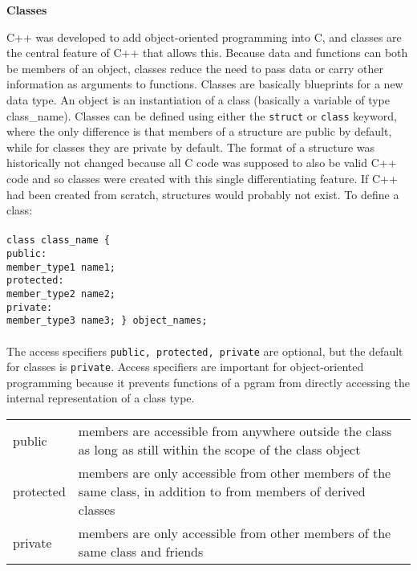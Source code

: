 \documentclass[10pt]{article}
\begin{document}
\begin{centering}
\color{blue}\textbf{Classes}\color{black}
\end{centering}
\begin{flushleft}\justify
C++ was developed to add object-oriented programming into C, and classes are the central feature of C++ that allows this. Because data and functions can both be members of an object, classes reduce the need to pass data or carry other information as arguments to functions. Classes are basically blueprints for a new data type. An object is an instantiation of a class (basically a variable of type class\_name). Classes can be defined using either the \texttt{struct} or \texttt{class} keyword, where the only difference is that members of a structure are public by default, while for classes they are private by default. The format of a structure was historically not changed because all C code was supposed to also be valid C++ code and so classes were created with this single differentiating feature. If C++ had been created from scratch, structures would probably not exist. To define a class:\\
\\
\color{red}\texttt{class class\_name \{ }\color{black}\\
\color{red}\quad\texttt{public:}\color{black}\\
\color{red}\quad\quad\texttt{member\_type1 name1;}\color{black}\\
\color{red}\quad\texttt{protected:}\color{black}\\
\color{red}\quad\quad\texttt{member\_type2 name2;}\color{black}\\
\color{red}\quad\texttt{private:}\color{black}\\
\color{red}\quad\quad\texttt{member\_type3 name3; \} object\_names;}\color{black}\\
\\
The access specifiers \texttt{public, protected, private} are optional, but the default for classes is \texttt{private}. Access specifiers are important for object-oriented programming because it prevents functions of a pgram from directly accessing the internal representation of a class type.

\begin{center}
\begin{tabular}{l l}
public & members are accessible from anywhere outside the class as long as still within the scope of the class object\\
protected & members are only accessible from other members of the same class, in addition to from members of derived classes\\
private & members are only accessible from other members of the same class and friends\\
\end{tabular}
\end{center}


\end{flushleft}
\end{document}
